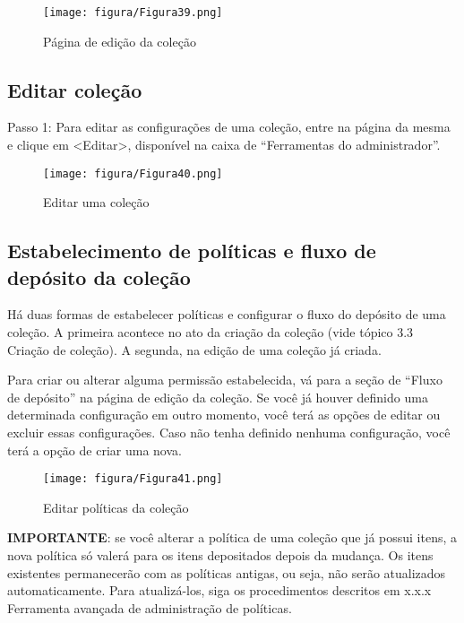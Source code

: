 \documentclass[12pt,hidelinks]{article}
\begin{document}
    \begin{figure}[!htp]
                \centering
                \texttt{[image: figura/Figura39.png]}
                \caption{Página de edição da coleção}
            \label{Rotulo}
        \end{figure}
    
\newpage

    \subsection{Editar coleção}
    
    Passo 1: Para editar as configurações de uma coleção, entre na página da mesma e clique em <Editar>, disponível na caixa de “Ferramentas do administrador”.
    
    \begin{figure}[!htp]
                \centering
                \texttt{[image: figura/Figura40.png]}
                \caption{Editar uma coleção}
            \label{Rotulo}
        \end{figure}
    
    \subsection{Estabelecimento de políticas e fluxo de depósito da coleção}
    
    Há duas formas de estabelecer políticas e configurar o fluxo do depósito de uma coleção. A primeira acontece no ato da criação da coleção (vide tópico 3.3 Criação de coleção). A segunda, na edição de uma coleção já criada.
    
    \singlespacing
    
    Para criar ou alterar alguma permissão estabelecida, vá para a seção de “Fluxo de depósito” na página de edição da coleção. Se você já houver definido uma determinada configuração em outro momento, você terá as opções de editar ou excluir essas configurações. Caso não tenha definido nenhuma configuração, você terá a opção de criar uma nova.
    
    \begin{figure}[!htp]
                \centering
                \texttt{[image: figura/Figura41.png]}
                \caption{Editar políticas da coleção}
            \label{Rotulo}
        \end{figure}

\newpage
    
    \textbf{IMPORTANTE}: se você alterar a política de uma coleção que já possui itens, a nova política só valerá para os itens depositados depois da mudança. Os itens existentes permanecerão com as políticas antigas, ou seja, não serão atualizados automaticamente. Para atualizá-los, siga os procedimentos descritos em x.x.x Ferramenta avançada de administração de políticas.
    
\end{document}
